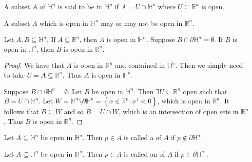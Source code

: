 \documentclass[notoc,notitlepage]{tufte-book}
\begin{document}
\begin{defn}\label{defn:open_subset_in_a_half_space}
  A subset $A$ of $\mathbb{H}^n$ is said to be  in $\mathbb{H}^n$ if $A = U
  \cap \mathbb{H}^n$ where $U \subseteq \mathbb{R}^n$ is open.
\end{defn}

\begin{note}
  A subset $A$ which is open in $\mathbb{H}^n$ may or may not be open in
  $\mathbb{R}^n$.
\end{note}

\begin{lemma}\label{lemma:characterization_of_open_sets_in_a_half_space}
  Let $A, B \subseteq \mathbb{H}^n$. If $A \subseteq \mathbb{R}^n$, then $A$ is
  open in $\mathbb{H}^n$. Suppose $B \cap \partial \mathbb{H}^n = \emptyset$. If
  $B$ is open in $\mathbb{H}^n$, then $B$ is open in $\mathbb{R}^n$.
\end{lemma}

\begin{proof}
  We have that $A$ is open in $\mathbb{R}^n$ and contained in $\mathbb{H}^n$.
  Then we simply need to take $U = A \subseteq \mathbb{R}^n$. Thus $A$ is open
  in $\mathbb{H}^n$.

  Suppose $B \cap \partial \mathbb{H}^n = \emptyset$. Let $B$ be open in
  $\mathbb{H}^n$. Then $\exists U \subseteq \mathbb{R}^n$ open such that $B = U
  \cap \mathbb{H}^n$. Let $W = \mathbb{H}^n \setminus \partial \mathbb{H}^n =
  \left\{ x \in \mathbb{R}^n : x^1 < 0 \right\}$,
  which is open in $\mathbb{R}^n$. It follows that $B \subseteq W$ and so $B = U
  \cap W$, which is an intersection of open sets in $\mathbb{R}^n$. Thus $B$ is
  open in $\mathbb{R}^n$.
\end{proof}

\begin{defn}\label{defn:interior_point_in_the_half_space}
  Let $A \subseteq \mathbb{H}^n$ be open in $\mathbb{H}^n$. Then $p \in A$ is
  called a  of $A$ if $p \notin \partial \mathbb{H}^n$
  .
\end{defn}

\begin{defn}\label{defn:boundary_point_in_the_half_space}
  Let $A \subseteq \mathbb{H}^n$ be open in $\mathbb{H}^n$. Then $p \in A$ is
  called an  of $A$ if $p \in \partial \mathbb{H}^n$
  .
\end{defn}
\end{document}
